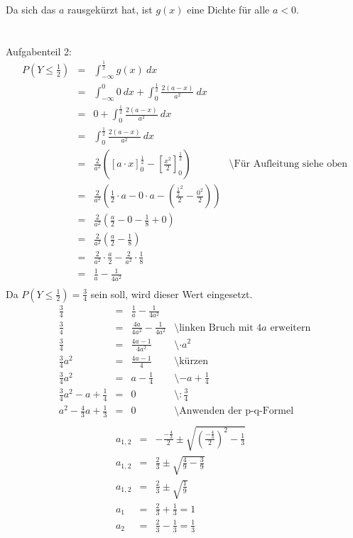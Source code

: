 \documentclass[twoside]{article}
\begin{document}
Da sich das $a$ rausgekürzt hat, ist $g(x)$ eine Dichte für alle $a<0$.\\
\\
\\
Aufgabenteil 2:
\[
    \begin{array}{rlll}
        P(Y\leq\frac{1}{2})&=&\int_{-\infty}^{\frac{1}{2}}g(x)~dx&\\
        &=&\int_{-\infty}^{0}0~dx+\int_{0}^{\frac{1}{2}}\frac{2(a-x)}{a^2}~dx&\\
        &=&0+\int_{0}^{\frac{1}{2}}\frac{2(a-x)}{a^2}~dx&\\
        &=&\int_{0}^{\frac{1}{2}}\frac{2(a-x)}{a^2}~dx&\\
        &=&\frac{2}{a^2}\left([a\cdot x]_{0}^{\frac{1}{2}}-[\frac{x^2}{2}]_{0}^{\frac{1}{2}}\right)&\text{\textbackslash Für Aufleitung siehe oben}\\
        &=&\frac{2}{a^2}\left(\frac{1}{2}\cdot a-0\cdot a-(\frac{\frac{1}{2}^2}{2}-\frac{0^2}{2})\right)&\\
        &=&\frac{2}{a^2}\left(\frac{a}{2}-0-\frac{1}{8}+0\right)&\\
        &=&\frac{2}{a^2}\left(\frac{a}{2}-\frac{1}{8}\right)&\\
        &=&\frac{2}{a^2}\cdot\frac{a}{2}-\frac{2}{a^2}\cdot\frac{1}{8}&\\
        &=&\frac{1}{a}-\frac{1}{4a^2}&\\
    \end{array}
\]
Da $P(Y\leq\frac{1}{2})=\frac{3}{4}$ sein soll, wird dieser Wert eingesetzt.
\[
    \begin{array}{rlll}
        \frac{3}{4}&=&\frac{1}{a}-\frac{1}{4a^2}&\\
        \frac{3}{4}&=&\frac{4a}{4a^2}-\frac{1}{4a^2}&\text{\textbackslash linken Bruch mit $4a$ erweitern}\\
        \frac{3}{4}&=&\frac{4a-1}{4a^2}&\text{\textbackslash $\cdot a^2$}\\        
        \frac{3}{4}a^2&=&\frac{4a-1}{4}&\text{\textbackslash kürzen}\\        
        \frac{3}{4}a^2&=&a-\frac{1}{4}&\text{\textbackslash $-a+\frac{1}{4}$}\\        
        \frac{3}{4}a^2-a+\frac{1}{4}&=&0&\text{\textbackslash $:\frac{3}{4}$}\\        
        a^2-\frac{4}{3}a+\frac{1}{3}&=&0&\text{\textbackslash Anwenden der p-q-Formel}\\        
    \end{array}
\]
\[
    \begin{array}{rlll}
        a_{1,2}&=&-\frac{-\frac{4}{3}}{2}\pm\sqrt{\left(\frac{-\frac{4}{3}}{2}\right)^2-\frac{1}{3}}&\\        
        a_{1,2}&=&\frac{2}{3}\pm\sqrt{\frac{4}{9}-\frac{3}{9}}&\\        
        a_{1,2}&=&\frac{2}{3}\pm\sqrt{\frac{1}{9}}&\\        
        a_{1}&=&\frac{2}{3}+\frac{1}{3}=1&\\
        a_{2}&=&\frac{2}{3}-\frac{1}{3}=\frac{1}{3}&\\        
       
    \end{array}
\]
\end{document}
